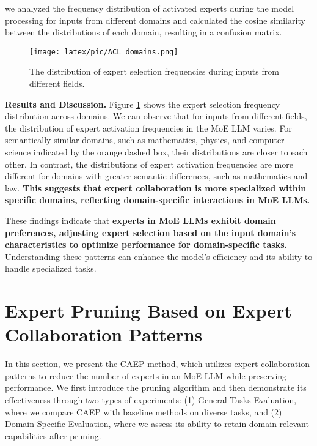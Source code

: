 \documentclass[11pt]{article}
\begin{document}
we analyzed the frequency distribution of activated experts during the model processing for inputs from different domains and calculated the cosine similarity between the distributions of each domain, resulting in a confusion matrix.

\begin{figure}[ht]
    \centering
    \texttt{[image: latex/pic/ACL\_domains.png]}
    \caption{The distribution of expert selection frequencies during inputs from different fields.}
    \label{distribution}
\end{figure}

\textbf{Results and Discussion.} Figure \ref{distribution} shows the expert selection frequency distribution across domains. We can observe that for inputs from different fields, the distribution of expert activation frequencies in the MoE LLM varies. For semantically similar domains, such as mathematics, physics, and computer science indicated by the orange dashed box, their distributions are closer to each other. In contrast, the distributions of expert activation frequencies are more different for domains with greater semantic differences, such as mathematics and law. \textbf{This suggests that expert collaboration is more specialized within specific domains, reflecting domain-specific interactions in MoE LLMs.}

These findings indicate that \textbf{experts in MoE LLMs exhibit domain preferences, adjusting expert selection based on the input domain's characteristics to optimize performance for domain-specific tasks.} Understanding these patterns can enhance the model's efficiency and its ability to handle specialized tasks.






\section{Expert Pruning Based on Expert Collaboration Patterns}
In this section, we present the CAEP method, which utilizes expert collaboration patterns to reduce the number of experts in an MoE LLM while preserving performance. We first introduce the pruning algorithm and then demonstrate its effectiveness through two types of experiments: (1) General Tasks Evaluation, where we compare CAEP with baseline methods on diverse tasks, and (2) Domain-Specific Evaluation, where we assess its ability to retain domain-relevant capabilities after pruning.
\end{document}
